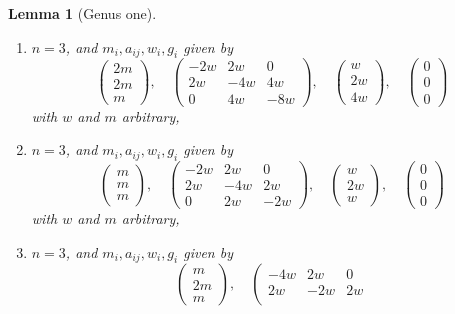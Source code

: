 \documentclass{stacks-project}
\theoremstyle{plain}
\newtheorem{lemma}[subsection]{Lemma}
\theoremstyle{definition}
\theoremstyle{remark}
\numberwithin{equation}{subsection}
\begin{document}
\begin{lemma}[Genus one]
\begin{enumerate}
\item
\label{item-up-up}
$n = 3$, and $m_i, a_{ij}, w_i, g_i$ given by
$$
\left(
\begin{matrix}
2m \\
2m \\
m
\end{matrix}
\right),
\quad
\left(
\begin{matrix}
-2w & 2w & 0 \\
2w & -4w & 4w \\
0 & 4w & -8w
\end{matrix}
\right),
\quad
\left(
\begin{matrix}
w \\
2w \\
4w
\end{matrix}
\right),
\quad
\left(
\begin{matrix}
0 \\
0 \\
0
\end{matrix}
\right)
$$
with $w$ and $m$ arbitrary,
\item
\label{item-up-down}
$n = 3$, and $m_i, a_{ij}, w_i, g_i$ given by
$$
\left(
\begin{matrix}
m \\
m \\
m
\end{matrix}
\right),
\quad
\left(
\begin{matrix}
-2w & 2w & 0 \\
2w & -4w & 2w \\
0 & 2w & -2w
\end{matrix}
\right),
\quad
\left(
\begin{matrix}
w \\
2w \\
w
\end{matrix}
\right),
\quad
\left(
\begin{matrix}
0 \\
0 \\
0
\end{matrix}
\right)
$$
with $w$ and $m$ arbitrary,
\item
\label{item-down-up}
$n = 3$, and $m_i, a_{ij}, w_i, g_i$ given by
$$
\left(
\begin{matrix}
m \\
2m \\
m
\end{matrix}
\right),
\quad
\left(
\begin{matrix}
-4w & 2w & 0 \\
2w & -2w & 2w \\

\end{matrix}$$
\end{enumerate}
\end{lemma}
\end{document}
